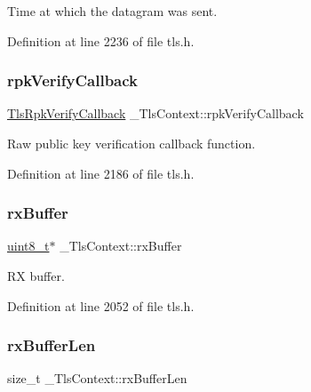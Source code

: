 Time at which the datagram was sent. 



Definition at line 2236 of file tls.\+h.

\mbox{\label{struct__TlsContext_a4be426a57ac9bb294c3be53583521ec7}} 
\subsubsection{\texorpdfstring{rpk\+Verify\+Callback}{rpkVerifyCallback}}
{\footnotesize\ttfamily \hyperlink{tls_8h_ab1f0e6b85cdc60baae331dee4c1ec77b}{Tls\+Rpk\+Verify\+Callback} \+\_\+\+Tls\+Context\+::rpk\+Verify\+Callback}



Raw public key verification callback function. 



Definition at line 2186 of file tls.\+h.

\mbox{\label{struct__TlsContext_a1cc3036e7bb97879806414376e44eef1}} 
\subsubsection{\texorpdfstring{rx\+Buffer}{rxBuffer}}
{\footnotesize\ttfamily \hyperlink{stdint_8h_aba7bc1797add20fe3efdf37ced1182c5}{uint8\+\_\+t}$\ast$ \+\_\+\+Tls\+Context\+::rx\+Buffer}



RX buffer. 



Definition at line 2052 of file tls.\+h.

\mbox{\label{struct__TlsContext_a66808b578adfdc49d2852bc4d426ec2f}} 
\subsubsection{\texorpdfstring{rx\+Buffer\+Len}{rxBufferLen}}
{\footnotesize\ttfamily size\+\_\+t \+\_\+\+Tls\+Context\+::rx\+Buffer\+Len}



